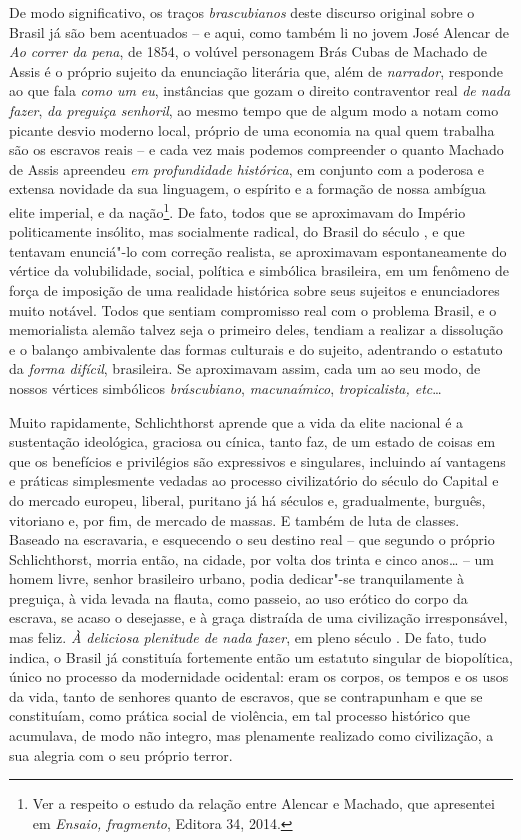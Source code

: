 De modo significativo, os traços \emph{brascubianos} deste discurso
original sobre o Brasil já são bem acentuados -- e aqui, como também li
no jovem José Alencar de \emph{Ao correr da pena}, de 1854, o volúvel
personagem Brás Cubas de Machado de Assis é o próprio sujeito da
enunciação literária que, além de \emph{narrador}, responde ao que fala
\emph{como um} \emph{eu}, instâncias que gozam o direito contraventor
real \emph{de nada fazer}, \emph{da preguiça senhoril}, ao mesmo tempo
que de algum modo a notam como picante desvio moderno local, próprio de
uma economia na qual quem trabalha são os escravos reais -- e cada vez
mais podemos compreender o quanto Machado de Assis apreendeu \emph{em
profundidade histórica}, em conjunto com a poderosa e extensa novidade
da sua linguagem, o espírito e a formação de nossa ambígua elite
imperial, e da nação\footnote{Ver a respeito o estudo da relação entre
  Alencar e Machado, que apresentei em \emph{Ensaio, fragmento}, Editora
  34, 2014.}. De fato, todos que se aproximavam do Império politicamente
insólito, mas socialmente radical, do Brasil do século , e que
tentavam enunciá"-lo com correção realista, se aproximavam
espontaneamente do vértice da volubilidade, social, política e simbólica
brasileira, em um fenômeno de força de imposição de uma realidade
histórica sobre seus sujeitos e enunciadores muito notável. Todos que
sentiam compromisso real com o problema Brasil, e o memorialista alemão
talvez seja o primeiro deles, tendiam a realizar a dissolução e o
balanço ambivalente das formas culturais e do sujeito, adentrando o
estatuto da \emph{forma difícil}, brasileira. Se aproximavam assim, cada
um ao seu modo, de nossos vértices simbólicos \emph{bráscubiano},
\emph{macunaímico}, \emph{tropicalista, etc}\ldots{}

Muito rapidamente, Schlichthorst aprende que a vida da elite nacional é
a sustentação ideológica, graciosa ou cínica, tanto faz, de um estado de
coisas em que os benefícios e privilégios são expressivos e singulares,
incluindo aí vantagens e práticas simplesmente vedadas ao processo
civilizatório do século do Capital e do mercado europeu, liberal,
puritano já há séculos e, gradualmente, burguês, vitoriano e, por fim,
de mercado de massas. E também de luta de classes. Baseado na
escravaria, e esquecendo o seu destino real -- que segundo o próprio
Schlichthorst, morria então, na cidade, por volta dos trinta e cinco
anos\ldots{} -- um homem livre, senhor brasileiro urbano, podia dedicar"-se
tranquilamente à preguiça, à vida levada na flauta, como passeio, ao uso
erótico do corpo da escrava, se acaso o desejasse, e à graça distraída
de uma civilização irresponsável, mas feliz. \emph{À deliciosa plenitude
de nada fazer}, em pleno século . De fato, tudo indica, o Brasil já
constituía fortemente então um estatuto singular de biopolítica, único
no processo da modernidade ocidental: eram os corpos, os tempos e os
usos da vida, tanto de senhores quanto de escravos, que se contrapunham
e que se constituíam, como prática social de violência, em tal processo
histórico que acumulava, de modo não integro, mas plenamente realizado
como civilização, a sua alegria com o seu próprio terror.

